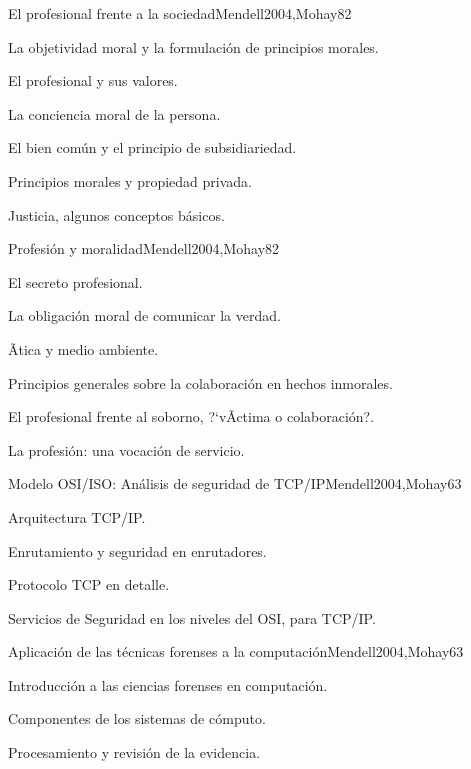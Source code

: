 \begin{syllabus}
\begin{unit}{El profesional frente a la sociedad}{Mendell2004,Mohay}{8}{2}
\begin{topics}
      \item {La objetividad moral y la formulación de principios morales.}
      \item {El profesional y sus valores.}
      \item {La conciencia moral de la persona.}
      \item {El bien común y el principio de subsidiariedad.}
      \item {Principios morales y propiedad privada.}
      \item {Justicia, algunos conceptos básicos.}
\end{topics}
\end{unit}

\begin{unit}{Profesión y moralidad}{Mendell2004,Mohay}{8}{2}
\begin{topics}
      \item {El secreto profesional.}
      \item {La obligación moral de comunicar la verdad.}
      \item {Ãtica y medio ambiente.}
      \item {Principios generales sobre la colaboración en hechos inmorales.}
      \item {El profesional frente al soborno, ?`vÃ­ctima o colaboración?.}
      \item {La profesión: una vocación de servicio.}
\end{topics}
\end{unit}

\begin{unit}{Modelo OSI/ISO: Análisis de seguridad de TCP/IP}{Mendell2004,Mohay}{6}{3}
\begin{topics}
      \item {Arquitectura TCP/IP.}
      \item {Enrutamiento y seguridad en enrutadores.}
      \item {Protocolo TCP en detalle.}
      \item {Servicios de Seguridad en los niveles del OSI, para TCP/IP.}
\end{topics}
\end{unit}

\begin{unit}{Aplicación de las técnicas forenses a la computación}{Mendell2004,Mohay}{6}{3}
\begin{topics}
      \item {Introducción a las ciencias forenses en computación.}
      \item {Componentes de los sistemas de cómputo.}
      \item {Procesamiento y revisión de la evidencia.}
\end{topics}
\end{unit}


\end{syllabus}
